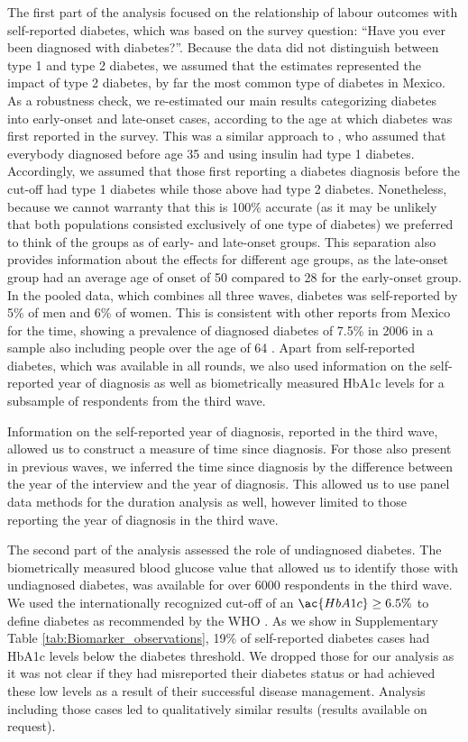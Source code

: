 \documentclass[12pt,english]{article}
\begin{document}
The first part of the analysis focused on the relationship of labour outcomes with self-reported diabetes, which was based on the survey question: “Have you ever been diagnosed with diabetes?”. Because the data did not distinguish between type 1 and type 2 diabetes, we assumed that the estimates represented the impact of type 2 diabetes, by far the most common type of diabetes in Mexico. As a robustness check, we re-estimated our main results categorizing diabetes into early-onset and late-onset cases, according to the age at which diabetes was first reported in the survey. This was a similar approach to \textcite{Alegre-Diaz2016}, who assumed that everybody diagnosed before age 35 and using insulin had type 1 diabetes. Accordingly, we assumed that those first reporting a diabetes diagnosis before the cut-off had type 1 diabetes while those above had type 2 diabetes. Nonetheless, because we cannot warranty that this is 100\% accurate (as it may be unlikely that both populations consisted exclusively of one type of diabetes) we preferred to think of the groups as of early- and late-onset groups. This separation also provides information about the effects for different age groups, as the late-onset group had an average age of onset of 50 compared to 28 for the early-onset group. In the pooled data, which combines all three waves, diabetes was self-reported by 5\% of men and 6\% of women. This is consistent with other reports from Mexico for the time, showing a prevalence of diagnosed diabetes of 7.5\% in 2006 in a sample also including people over the age of 64 \parencite{Barquera2013}. Apart from self-reported diabetes, which was available in all rounds, we also used information on the self-reported year of diagnosis as well as biometrically measured \ac{HbA1c} levels for a subsample of respondents from the third wave.


Information on the self-reported year of diagnosis, reported in the third wave, allowed us to construct a measure of time since diagnosis. For those also present in previous waves, we inferred the time since diagnosis by the difference between the year of the interview and the year of diagnosis. This allowed us to use panel data methods for the duration analysis as well, however limited to those reporting the year of diagnosis in the third wave. 

The second part of the analysis assessed the role of undiagnosed diabetes. The biometrically measured blood glucose value that allowed us to identify those with undiagnosed diabetes, was available for over 6000 respondents in the third wave. We used the internationally recognized cut-off of an $\ac{HbA1c} \geq 6.5\%$ to define diabetes as recommended by the \ac{WHO} \parencite{WorldHealthOrganization2011}.  As we show in Supplementary Table \ref{tab:Biomarker_observations}, 19\% of self-reported diabetes cases had \ac{HbA1c} levels below the diabetes threshold. We dropped those for our analysis as it was not clear if they had misreported their diabetes status or had achieved these low levels as a result of their successful disease management. Analysis including those cases led to qualitatively similar results (results available on request).
\end{document}
